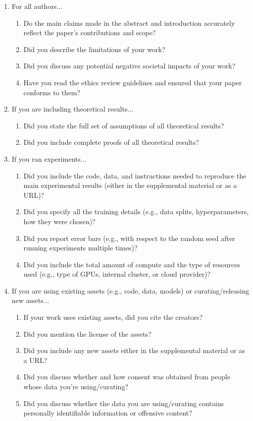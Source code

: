 \documentclass{article}
\begin{document}
{\begin{enumerate}
\item For all authors...
\begin{enumerate}
  \item Do the main claims made in the abstract and introduction accurately reflect the paper's contributions and scope?
    \answerTODO{}
  \item Did you describe the limitations of your work?
    \answerTODO{}
  \item Did you discuss any potential negative societal impacts of your work?
    \answerTODO{}
  \item Have you read the ethics review guidelines and ensured that your paper conforms to them?
    \answerTODO{}
\end{enumerate}


\item If you are including theoretical results...
\begin{enumerate}
  \item Did you state the full set of assumptions of all theoretical results?
    \answerTODO{}
        \item Did you include complete proofs of all theoretical results?
    \answerTODO{}
\end{enumerate}


\item If you ran experiments...
\begin{enumerate}
  \item Did you include the code, data, and instructions needed to reproduce the main experimental results (either in the supplemental material or as a URL)?
    \answerTODO{}
  \item Did you specify all the training details (e.g., data splits, hyperparameters, how they were chosen)?
    \answerTODO{}
        \item Did you report error bars (e.g., with respect to the random seed after running experiments multiple times)?
    \answerTODO{}
        \item Did you include the total amount of compute and the type of resources used (e.g., type of GPUs, internal cluster, or cloud provider)?
    \answerTODO{}
\end{enumerate}


\item If you are using existing assets (e.g., code, data, models) or curating/releasing new assets...
\begin{enumerate}
  \item If your work uses existing assets, did you cite the creators?
    \answerTODO{}
  \item Did you mention the license of the assets?
    \answerTODO{}
  \item Did you include any new assets either in the supplemental material or as a URL?
    \answerTODO{}
  \item Did you discuss whether and how consent was obtained from people whose data you're using/curating?
    \answerTODO{}
  \item Did you discuss whether the data you are using/curating contains personally identifiable information or offensive content?
    \answerTODO{}
\end{enumerate}



\end{enumerate}}
\end{document}
